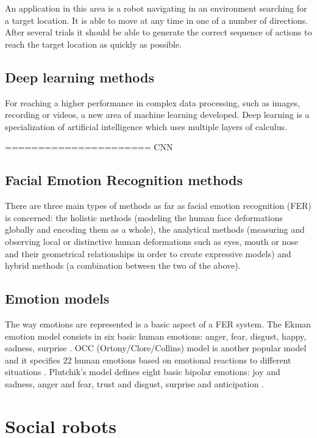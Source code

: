 \documentclass[runningheads,a4paper,12pt]{report}
\begin{document}
An application in this area is a robot navigating in an environment searching for a target location. It is able to move at any time in one of a number of directions. After several trials it should be able to generate the correct sequence of actions to reach the target location as quickly as possible.  

\subsection{Deep learning methods}
For reaching a higher performance in complex data processing, such as images, recording or videos, a new area of machine learning developed. Deep learning is a specialization of artificial intelligence which uses multiple layers of calculus. 

====================== CNN 

\subsection{Facial Emotion Recognition methods}
There are three main types of methods as far as facial emotion recognition (FER) is concerned: the holistic methods (modeling the human face deformations globally and encoding them as a whole), the analytical methods (measuring and observing local or distinctive human deformations such as eyes, mouth or nose and their geometrical relationships in order to create expressive models) and hybrid methods (a combination between the two of the above)\cite{automatic-analysis-of-facial-expressions}. 

\subsection{Emotion models}
The way emotions are represented is a basic aspect of a FER system. The Ekman emotion model consists in six basic human emotions: anger, fear, disgust, happy, sadness, surprise \cite{basic-emotions}. OCC (Ortony/Clore/Collins) model is another popular model and it specifies 22 human emotions based on emotional reactions to different situations \cite{the-cognitive-structure-of-emotions}. Plutchik's model defines eight basic bipolar emotions: joy and sadness, anger and fear, trust and disgust, surprise and anticipation \cite{the-nature-of-emotions}.

\section{Social robots}
\label{chapter:social}
\end{document}
